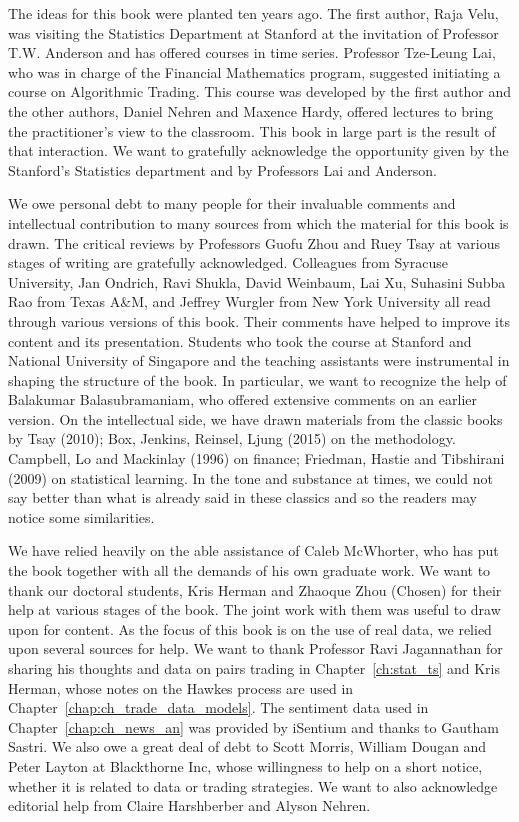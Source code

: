 The ideas for this book were planted ten years ago. The first author, Raja Velu, was visiting the Statistics Department at Stanford at the invitation of Professor T.W. Anderson and has offered courses in time series. Professor Tze-Leung Lai, who was in charge of the Financial Mathematics program, suggested initiating a course on Algorithmic Trading. This course was developed by the first author and the other authors, Daniel Nehren and Maxence Hardy, offered lectures to bring the practitioner's view to the classroom. This book in large part is the result of that interaction. We want to gratefully acknowledge the opportunity given by the Stanford's Statistics department and by Professors Lai and Anderson. 


We owe personal debt to many people for their invaluable comments and intellectual contribution to many sources from which the material for this book is drawn. The critical reviews by Professors Guofu Zhou and Ruey Tsay at various stages of writing are gratefully acknowledged. Colleagues from Syracuse University, Jan Ondrich, Ravi Shukla, David Weinbaum, Lai Xu, Suhasini Subba Rao from Texas A\&M, and Jeffrey Wurgler from New York University all read through various versions of this book. Their comments have helped to improve its content and its presentation. Students who took the course at Stanford and National University of Singapore and the teaching assistants were instrumental in shaping the structure of the book. In particular, we want to recognize the help of Balakumar Balasubramaniam, who offered extensive comments on an earlier version. On the intellectual side, we have drawn materials from the classic books by Tsay (2010); Box, Jenkins, Reinsel, Ljung (2015) on the methodology. Campbell, Lo and Mackinlay (1996) on finance; Friedman, Hastie and Tibshirani (2009) on statistical learning. In the tone and substance at times, we could not say better than what is already said in these classics and so the readers may notice some similarities.


We have relied heavily on the able assistance of Caleb McWhorter, who has put the book together with all the demands of his own graduate work. We want to thank our doctoral students, Kris Herman and Zhaoque Zhou (Chosen) for their help at various stages of the book. The joint work with them was useful to draw upon for content. As the focus of this book is on the use of real data, we relied upon several sources for help. We want to thank Professor Ravi Jagannathan for sharing his thoughts and data on pairs trading in Chapter~\ref{ch:stat_ts} and Kris Herman, whose notes on the Hawkes process are used in Chapter~\ref{chap:ch_trade_data_models}. The sentiment data used in Chapter~\ref{chap:ch_news_an} was provided by iSentium and thanks to Gautham Sastri. We also owe a great deal of debt to Scott Morris, William Dougan and Peter Layton at Blackthorne Inc, whose willingness to help on a short notice, whether it is related to data or trading strategies. We want to also acknowledge editorial help from Claire Harshberber and Alyson Nehren. 


